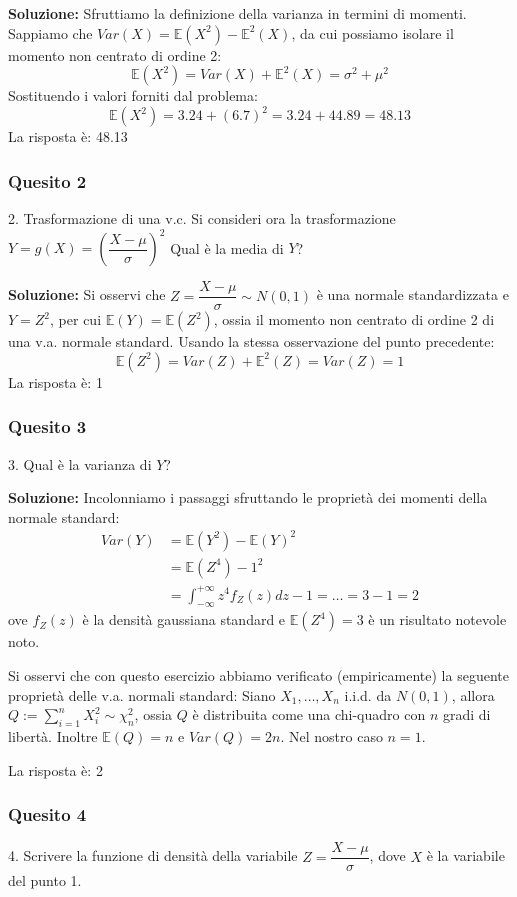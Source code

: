 \documentclass[12pt, a4paper]{article}
\begin{document}
\textbf{Soluzione:}
Sfruttiamo la definizione della varianza in termini di momenti. Sappiamo che $Var(X) = \mathbb{E}(X^2) - \mathbb{E}^2(X)$, da cui possiamo isolare il momento non centrato di ordine 2:
$$ \mathbb{E}(X^2) = Var(X) + \mathbb{E}^2(X) = \sigma^2 + \mu^2 $$
Sostituendo i valori forniti dal problema:
$$ \mathbb{E}(X^2) = 3.24 + (6.7)^2 = 3.24 + 44.89 = 48.13 $$
La risposta è: 48.13

\subsubsection*{Quesito 2}
2. Trasformazione di una v.c.
Si consideri ora la trasformazione $Y=g(X)=\left(\dfrac{X-\mu}{\sigma}\right)^2$
Qual è la media di $Y$?

\textbf{Soluzione:}
Si osservi che $Z = \dfrac{X-\mu}{\sigma} \sim N(0,1)$ è una normale standardizzata e $Y=Z^2$, per cui $\mathbb{E}(Y) = \mathbb{E}(Z^2)$, ossia il momento non centrato di ordine 2 di una v.a. normale standard. 
Usando la stessa osservazione del punto precedente: 
$$ \mathbb{E}(Z^2) = Var(Z) + \mathbb{E}^2(Z) = Var(Z) = 1 $$
La risposta è: 1

\newpage

\subsubsection*{Quesito 3}
3. Qual è la varianza di $Y$?

\textbf{Soluzione:}
Incolonniamo i passaggi sfruttando le proprietà dei momenti della normale standard:
$$ \begin{aligned} Var(Y) &= \mathbb{E}(Y^2) - \mathbb{E}(Y)^2 \\ &= \mathbb{E}(Z^4) - 1^2 \\ &= \int_{-\infty}^{+\infty} z^4 f_Z(z) dz - 1 = \dots = 3 - 1 = 2 \end{aligned} $$
ove $f_Z(z)$ è la densità gaussiana standard e $\mathbb{E}(Z^4) = 3$ è un risultato notevole noto.

Si osservi che con questo esercizio abbiamo verificato (empiricamente) la seguente proprietà delle v.a. normali standard:
Siano $X_1,\dots,X_n$ i.i.d. da $N(0,1)$, allora $Q := \sum_{i=1}^n X_i^2 \sim \chi^2_n$, ossia $Q$ è distribuita come una chi-quadro con $n$ gradi di libertà.
Inoltre $\mathbb{E}(Q) = n$ e $Var(Q) = 2n$. Nel nostro caso $n=1$.

La risposta è: 2

\subsubsection*{Quesito 4}
4. Scrivere la funzione di densità della variabile $Z=\dfrac{X-\mu}{\sigma}$, dove $X$ è la variabile del punto 1.
\end{document}
